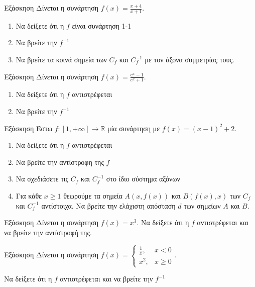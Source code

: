 \documentclass[greek]{beamer}
\begin{document}
\begin{frame}{Εξάσκηση}
 Δίνεται η συνάρτηση $f(x)=\frac{x+4}{x+1}$.
 \begin{enumerate}
  \item Να δείξετε ότι η $f$ είναι συνάρτηση 1-1 \pause
  \item Να βρείτε την $f^{-1}$
  \item Να βρείτε τα κοινά σημεία των $C_f$ και $C_f^{-1}$ με τον άξονα συμμετρίας τους.
 \end{enumerate}
\end{frame}

\begin{frame}{Εξάσκηση}
 Δίνεται η συνάρτηση $f(x)=\frac{e^x-1}{e^x+1}$.
 \begin{enumerate}
  \item Να δείξετε ότι η $f$ αντιστρέφεται\pause
  \item Να βρείτε την $f^{-1}$
 \end{enumerate}
\end{frame}

\begin{frame}{Εξάσκηση}
 Έστω $f:[1,+\infty]\to \mathbb{R}$ μία συνάρτηση με $f(x)=(x-1)^2+2$.
 \begin{enumerate}
  \item Να δείξετε ότι η $f$ αντιστρέφεται \pause
  \item Να βρείτε την αντίστροφη της $f$ \pause
  \item Να σχεδιάσετε τις $C_f$ και $C_f^{-1}$ στο ίδιο σύστημα αξόνων\pause
  \item Για κάθε $x\ge 1$ θεωρούμε τα σημεία $Α(x,f(x))$ και $Β(f(x),x)$ των $C_f$ και $C_f^{-1}$ αντίστοιχα. Να βρείτε την ελάχιστη απόσταση $d$ των σημείων $Α$ και $Β$.
 \end{enumerate}
\end{frame}

\begin{frame}{Εξάσκηση}
 Δίνεται η συνάρτηση $f(x)=x^3$. Να δείξετε ότι η $f$ αντιστρέφεται και να βρείτε την αντίστροφή της.
\end{frame}

\begin{frame}{Εξάσκηση}
 Δίνεται η συνάρτηση $f(x)=\begin{cases}
   \frac{1}{x}, & x<0    \\
   x^2,         & x\ge 0
  \end{cases}$.

 Να δείξετε ότι η $f$ αντιστρέφεται και να βρείτε την $f^{-1}$
\end{frame}
\end{document}
